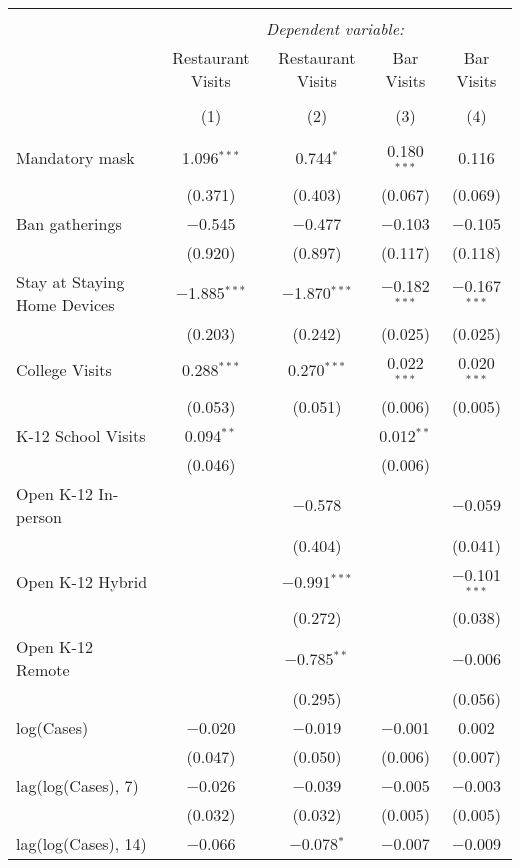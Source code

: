 \begin{tabular}{@{\extracolsep{1pt}}lcccc} 
\\[-1.8ex]\hline 
\hline \\[-1.8ex] 
 & \multicolumn{4}{c}{\textit{Dependent variable:}} \\ 
\cline{2-5} 
 & Restaurant Visits & Restaurant Visits & Bar Visits & Bar Visits \\ 
\\[-1.8ex] & (1) & (2) & (3) & (4)\\ 
\hline \\[-1.8ex] 
 Mandatory mask & 1.096$^{***}$ & 0.744$^{*}$ & 0.180$^{***}$ & 0.116 \\ 
  & (0.371) & (0.403) & (0.067) & (0.069) \\ 
  Ban gatherings & $-$0.545 & $-$0.477 & $-$0.103 & $-$0.105 \\ 
  & (0.920) & (0.897) & (0.117) & (0.118) \\ 
  Stay at Staying Home Devices & $-$1.885$^{***}$ & $-$1.870$^{***}$ & $-$0.182$^{***}$ & $-$0.167$^{***}$ \\ 
  & (0.203) & (0.242) & (0.025) & (0.025) \\ 
  College Visits & 0.288$^{***}$ & 0.270$^{***}$ & 0.022$^{***}$ & 0.020$^{***}$ \\ 
  & (0.053) & (0.051) & (0.006) & (0.005) \\ 
  K-12 School Visits & 0.094$^{**}$ &  & 0.012$^{**}$ &  \\ 
  & (0.046) &  & (0.006) &  \\ 
  Open K-12 In-person &  & $-$0.578 &  & $-$0.059 \\ 
  &  & (0.404) &  & (0.041) \\ 
  Open K-12 Hybrid &  & $-$0.991$^{***}$ &  & $-$0.101$^{***}$ \\ 
  &  & (0.272) &  & (0.038) \\ 
  Open K-12 Remote &  & $-$0.785$^{**}$ &  & $-$0.006 \\ 
  &  & (0.295) &  & (0.056) \\ 
  log(Cases) & $-$0.020 & $-$0.019 & $-$0.001 & 0.002 \\ 
  & (0.047) & (0.050) & (0.006) & (0.007) \\ 
  lag(log(Cases), 7) & $-$0.026 & $-$0.039 & $-$0.005 & $-$0.003 \\ 
  & (0.032) & (0.032) & (0.005) & (0.005) \\ 
  lag(log(Cases), 14) & $-$0.066 & $-$0.078$^{*}$ & $-$0.007 & $-$0.009 \\ 

\end{tabular}
